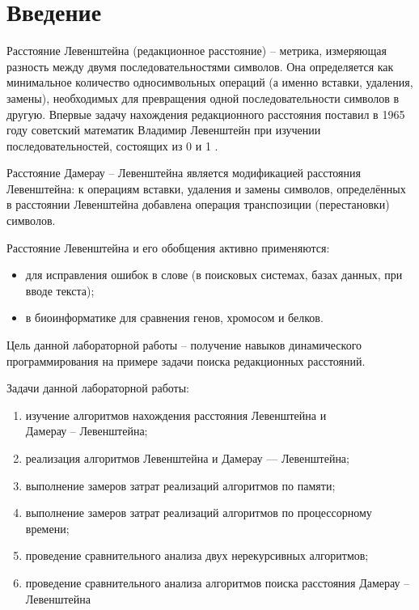 \chapter*{Введение}
\thispagestyle{empty}

Расстояние Левенштейна (редакционное расстояние) -- метрика, измеряющая разность между двумя последовательностями символов. Она определяется как минимальное количество односимвольных операций (а именно вставки, удаления, замены), необходимых для превращения одной последовательности символов в другую. Впервые задачу нахождения редакционного расстояния поставил в 1965 году советский математик Владимир Левенштейн при изучении последовательностей, состоящих из 0 и 1 \cite{Levenshtein}.

Расстояние Дамерау -- Левенштейна является модификацией расстояния Левенштейна: к операциям вставки, удаления и замены символов, определённых в расстоянии Левенштейна добавлена операция транспозиции (перестановки) символов.

Расстояние Левенштейна и его обобщения активно применяются:
\begin{itemize}
	\item для исправления ошибок в слове (в поисковых системах, базах данных, при вводе текста);
	\item в биоинформатике для сравнения генов, хромосом и белков.
\end{itemize}

Цель данной лабораторной работы -- получение навыков динамического программирования на примере задачи поиска редакционных расстояний.


Задачи данной лабораторной работы:
\begin{enumerate}[label=\arabic*)]
	\item изучение алгоритмов нахождения расстояния Левенштейна и\\ Дамерау -- Левенштейна;
	\item реализация алгоритмов Левенштейна и Дамерау — Левенштейна;
	\item выполнение замеров затрат реализаций алгоритмов по памяти;
	\item выполнение замеров затрат реализаций алгоритмов по процессорному времени;
	\item проведение сравнительного анализа двух нерекурсивных алгоритмов;
	\item проведение сравнительного анализа алгоритмов поиска расстояния Дамерау -- Левенштейна
\end{enumerate}